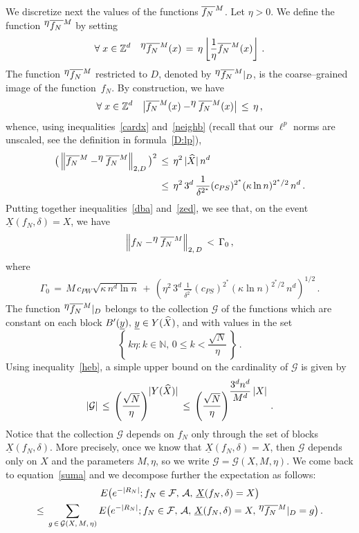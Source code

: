 \documentclass[AHL, Unicode, longabstracts, published]{cedram}
\newcommand{\XX}{{\underline{X}}}
\newcommand{\yy}{{\underline{y}}}
\newcommand*\fmn{\overline{f_N\,}^{\lower2pt\hbox{$\scriptstyle M$}}}
\newcommand*\fmne{^{\displaystyle \eta}\overline{f_N\,}^{\lower2pt\hbox{$\scriptstyle M$}}}
\newcommand*\Zd {{\mathbb Z^d}}
\newcommand*\N {{\mathbb N}}
\newcommand*\hX{\smash{\widehat X}}
\newcommand{\cA}{\mathcal{A}}
\newcommand{\cF}{\mathcal{F}}
\newcommand{\cG}{\mathcal{G}}
\renewcommand{\N}{\mathbb{N}}
\let\oldforall\forall
\renewcommand*{\forall}{\mathrel{\oldforall}}
\begin{document}
We discretize next the values of the functions $\fmn$. Let $\eta>0$. We define the function $\fmne$ by setting
\[
\forall x\in\Zd\quad
\fmne(x)\,=\, \eta\left\lfloor
\frac{1}{\eta}{\fmn(x)}
\right\rfloor
\,.
\]
The function $\fmne$ restricted to $D$, denoted by $\fmne|_D$, is the coarse--grained image of the function~$f_N$. By construction, we have
\[
\forall x\in \Zd\quad
\big|\fmn(x)-\fmne(x)\big|\,\leq\,\eta\,,
\]
whence, using inequalities~\eqref{cardx} and~\eqref{neighb} (recall that our $\ell^p$ norms are unscaled, see the definition in formula~\eqref{D:lp}),
\begin{equation}\label{zed}
\begin{aligned}
\big(\left\|\fmn-\fmne\right\|_{2,D}\big)^2&\,\leq\,
\eta^2\,|\hX|\,n^d\\ &\,\leq\,
\eta^2\,3^d\,
\frac{1} { \delta^{2^*}} (c_{PS})^{2^*} (\kappa\ln n)^{2^*/2}
\,n^d\,.
\end{aligned}
\end{equation}
Putting together inequalities~\eqref{dba} and~\eqref{zed}, we see that, on the event $\XX(f_N,\delta)=X$, we have
\begin{equation}\label{rty}
\left\|f_N-\fmne\right\|_{2,\,D}\,<\,\Gamma_0\,,
\end{equation}
where
\begin{align}
\Gamma_0\,=\, M\,c_{PW}
\sqrt{\kappa \,n^d\ln n}
\,+\,
\left(\eta^2\,3^d\,
\frac{1} { \delta^{2^*}} (c_{PS})^{2^*} (\kappa\ln n)^{2^*/2}
\,n^d\right)^{1/2}\,.
\end{align}
The function $\fmne|_D$ belongs to the collection $\cG$ of the functions which are constant on each block $B'(\yy),\,\yy\in Y(\hX)$, and with values in the set
\[
\left\{\,k\eta:k\in\N,\,0\leq k< \frac{\sqrt{N}}{\eta}\,\right\}\,.
\]
Using inequality~\eqref{heb}, a simple upper bound on the cardinality of $\cG$ is given by
\begin{equation}\label{sib}
|\cG|
\,\leq\,
\left(\frac{\sqrt{N}}{\eta}\right)^{\displaystyle|Y(\hX)|}
\,\leq\,
\left(\frac{\sqrt{N}}{\eta}\right)^{\displaystyle
\frac{3^dn^d}{M^d}\,|X|}
\,.
\end{equation}
Notice that the collection $\cG$ depends on $f_N$ only through the set of blocks $\XX(f_N,\delta)$. More precisely, once we know that $\XX(f_N,\delta)=X$, then $\cG$ depends only on $X$ and the parameters $M,\eta$, so we write $\cG=\cG(X,M,\eta)$. We come back to equation~\eqref{suma} and we decompose further the expectation as follows:
\begin{multline}\label{sumb}
E\big(e^{-|R_N|};f_N\in\cF,\,\cA,\,\XX(f_N,\delta)=X\big)\\
\leq\,\sum_{g\,\in\,\cG(X,\,M,\,\eta)} E\big(e^{-|R_N|}; f_N\in\cF,\,\cA,\,\XX(f_N,\delta)=X,\,
\fmne|_D=g
\big)\,.
\end{multline}
\end{document}
